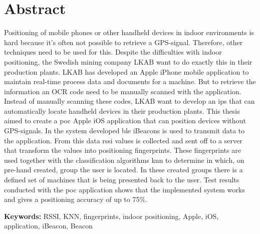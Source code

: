 \newpage
\chapter*{Abstract}
Positioning of mobile phones or other handheld devices in indoor environments is hard because it's often not possible to retrieve a GPS-signal.
Therefore, other techniques need to be used for this.
Despite the difficulties with indoor positioning, the Swedish mining company LKAB want to do exactly this in  their production plants.
LKAB has developed an Apple iPhone mobile application to maintain real-time process data and documents for a machine.
But to retrieve the information an OCR code need to be manually scanned with the application.
Instead of manually scanning these codes, LKAB want to develop an \acrlong{ips} that can automatically locate handheld devices in their production plants.
This thesis aimed to create a \acrfull{poc} Apple iOS application that can position devices without GPS-signals.
In the system developed \acrlong{ble} iBeacons is used to transmit data to the application.
From this data \acrlong{rssi} values is  collected and sent off to a server that transform the values into positioning fingerprints.
These fingerprints are used together with the classification algorithms \acrlong{knn} to determine in which, on pre-hand created, group the user is located.
In these created groups there is a defined set of machines that is being presented back to the user.
Test results conducted with the \acrshort{poc} application shows that the implemented system works and gives a positioning accuracy of up to 75\%.


\bigskip

\textbf{Keywords:} RSSI, KNN, fingerprints, indoor positioning, Apple, iOS, application, iBeacon, Beacon
